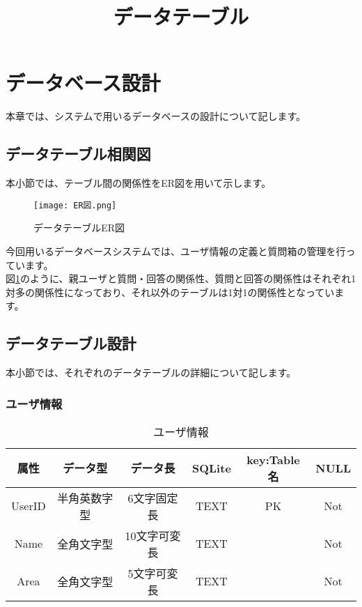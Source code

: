 \documentclass[a4j]{jarticle}
\title{
\vspace{30mm}
{\bf データテーブル}
\date{}
}
\begin{document}
\maketitle
\section{データベース設計}
本章では、システムで用いるデータベースの設計について記します。
\subsection{データテーブル相関図}
本小節では、テーブル間の関係性をER図を用いて示します。
\begin{figure}[H]
  \begin{center} %
    \texttt{[image: ER図.png]}
    \caption{データテーブルER図} %
    \label{fig:er} %
  \end{center}
\end{figure}

今回用いるデータベースシステムでは、ユーザ情報の定義と質問箱の管理を行っています。\\
図\ref{fig:er}のように、親ユーザと質問・回答の関係性、質問と回答の関係性はそれぞれ1対多の関係性になっており、それ以外のテーブルは1対1の関係性となっています。

\subsection{データテーブル設計}
本小節では、それぞれのデータテーブルの詳細について記します。

\subsubsection{ユーザ情報}

\begin{table}[H]
    \caption{ユーザ情報}
    \label{tbl: user}
    \begin{center}
        \begin{tabular}{|c|c|c|c|c|c|} \hline
            属性 & データ型 & データ長 & SQLite & key:Table名 & NULL\\ \hline \hline
            UserID & 半角英数字型 & 6文字固定長 & TEXT & PK & Not\\ \hline
            Name & 全角文字型 & 10文字可変長 & TEXT & & Not\\ \hline
            Area & 全角文字型 & 5文字可変長 & TEXT & & Not\\ \hline
        \end{tabular}
    \end{center}
\end{table}
\end{document}
